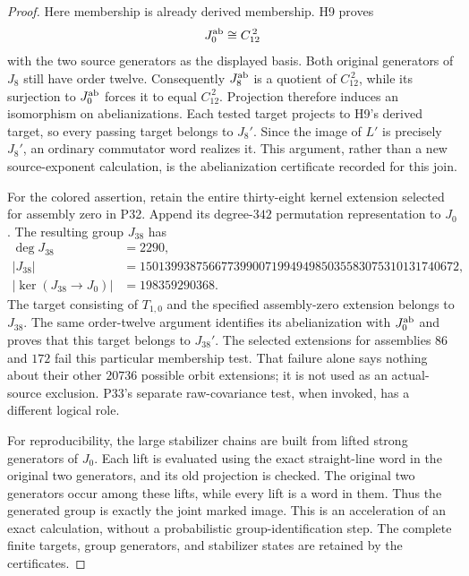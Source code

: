 \begin{proof}
Here membership is already derived membership. H9 proves
\[
                         J_0^{\rm ab}\cong C_{12}^{\,2}
\]
with the two source generators as the displayed basis.
Both original generators of $J_8$ still have order twelve.
Consequently $J_8^{\rm ab}$ is a quotient of $C_{12}^{\,2}$,
while its surjection to $J_0^{\rm ab}$ forces it to equal
$C_{12}^{\,2}$. Projection therefore induces an isomorphism
on abelianizations. Each tested target projects to H9's
derived target, so every passing target belongs to $J_8'$.
Since the image of $L'$ is precisely $J_8'$, an ordinary
commutator word realizes it. This argument, rather than a
new source-exponent calculation, is the abelianization
certificate recorded for this join.

For the colored assertion, retain the entire thirty-eight
kernel extension selected for assembly zero in P32. Append
its degree-$342$ permutation representation to $J_0$.
The resulting group $J_{38}$ has
\[
\begin{split}
 \deg J_{38}&=2290,\\
 |J_{38}|&=150139938756677399007199494985035583075310131740672,\\
 |\ker(J_{38}\to J_0)|&=198359290368.
\end{split}
                                                        \tag{D23.F41.2}
\]
The target consisting of $T_{1,0}$ and the specified
assembly-zero extension belongs to $J_{38}$. The same
order-twelve argument identifies its abelianization with
$J_0^{\rm ab}$ and proves that this target belongs to
$J_{38}'$. The selected extensions for assemblies $86$
and $172$ fail this particular membership test. That
failure alone says nothing about their other $20736$
possible orbit extensions; it is not used as an actual-source
exclusion. P33's separate raw-covariance test, when invoked,
has a different logical role.

For reproducibility, the large stabilizer chains are built
from lifted strong generators of $J_0$. Each lift is evaluated
using the exact straight-line word in the original two
generators, and its old projection is checked. The original
two generators occur among these lifts, while every lift
is a word in them. Thus the generated group is exactly the
joint marked image. This is an acceleration of an exact
calculation, without a probabilistic group-identification
step. The complete finite targets, group generators, and
stabilizer states are retained by the certificates.


\end{proof}
